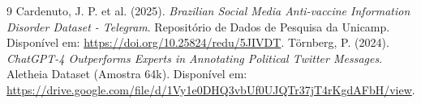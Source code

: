 \documentclass[10pt,twocolumn,a4paper]{article}
\begin{document}
\begin{thebibliography}{9}
Cardenuto, J. P. et al. (2025). \textit{Brazilian Social Media Anti-vaccine Information Disorder Dataset - Telegram}. Repositório de Dados de Pesquisa da Unicamp. Disponível em: \url{https://doi.org/10.25824/redu/5JIVDT}.
Törnberg, P. (2024). \textit{ChatGPT-4 Outperforms Experts in Annotating Political Twitter Messages}.
Aletheia Dataset (Amostra 64k). Disponível em: \url{https://drive.google.com/file/d/1Vy1e0DHQ3vbUf0UJQTr37jT4rKgdAFbH/view}.
\end{thebibliography}
\end{document}
